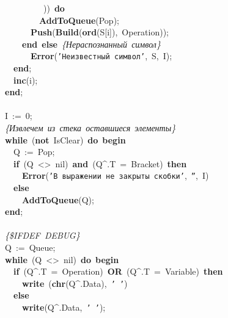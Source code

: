 \mbox{}\ \ \ \ \ \ \ \ \ \ \ ))\ \textbf{do} \\
\mbox{}\ \ \ \ \ \ \ \ \ \ \textbf{AddToQueue}(Pop);\ \ \ \  \\
\mbox{}\ \ \ \ \ \ \ \ \textbf{Push}(\textbf{Build}(\textbf{ord}(S[i]),\ Operation)); \\
\mbox{}\ \ \ \ \ \ \textbf{end}\ \textbf{else}\ \textit{\{Нераспознанный\ символ\}} \\
\mbox{}\ \ \ \ \ \ \ \ \textbf{Error}(\texttt{'Неизвестный\ символ'},\ S,\ I); \\
\mbox{}\ \ \ \ \textbf{end}; \\
\mbox{}\ \ \ \ \textbf{inc}(i); \\
\mbox{}\ \ \textbf{end}; \\
\mbox{} \\
\mbox{}\ \ I\ :=\ 0; \\
\mbox{}\ \ \textit{\{Извлечем\ из\ стека\ оставшиеся\ элементы\}} \\
\mbox{}\ \ \textbf{while}\ (\textbf{not}\ IsClear)\ \textbf{do}\ \textbf{begin} \\
\mbox{}\ \ \ \ Q\ :=\ Pop; \\
\mbox{}\ \ \ \ \textbf{if}\ (Q\ \textless{}\textgreater{}\ nil)\ \textbf{and}\ (Q\textasciicircum{}.T\ =\ Bracket)\ \textbf{then} \\
\mbox{}\ \ \ \ \ \ \textbf{Error}(\texttt{'В\ выражении\ не\ закрыты\ скобки'},\ \texttt{''},\ I) \\
\mbox{}\ \ \ \ \textbf{else} \\
\mbox{}\ \ \ \ \ \ \textbf{AddToQueue}(Q); \\
\mbox{}\ \ \textbf{end}; \\
\mbox{} \\
\mbox{}\ \ \textit{\{\$IFDEF\ DEBUG\}} \\
\mbox{}\ \ Q\ :=\ Queue; \\
\mbox{}\ \ \textbf{while}\ (Q\ \textless{}\textgreater{}\ nil)\ \textbf{do}\ \textbf{begin} \\
\mbox{}\ \ \ \ \textbf{if}\ (Q\textasciicircum{}.T\ =\ Operation)\ \textbf{OR}\ (Q\textasciicircum{}.T\ =\ Variable)\ \textbf{then} \\
\mbox{}\ \ \ \ \ \ \textbf{write}\ (\textbf{chr}(Q\textasciicircum{}.Data),\ \texttt{'\ '}) \\
\mbox{}\ \ \ \ \textbf{else} \\
\mbox{}\ \ \ \ \ \ \textbf{write}(Q\textasciicircum{}.Data,\ \texttt{'\ '}); \\
\mbox{} \\
